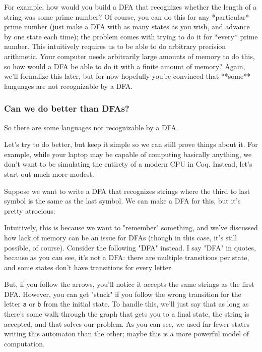 For example, how would you build a DFA that recognizes whether the length of a string was some prime number?
Of course, you can do this for any *particular* prime number (just make a DFA with as many states as you wish, and advance by one state each time); the problem comes with trying to do it for *every* prime number.
This intuitively requires us to be able to do arbitrary precision arithmetic.
Your computer needs arbitrarily large amounts of memory to do this, so how would a DFA be able to do it with a finite amount of memory?
Again, we'll formalize this later, but for now hopefully you're convinced that **some** languages are not recognizable by a DFA.

\subsubsection{Can we do better than DFAs?}

So there are some languages not recognizable by a DFA.

Let's try to do better, but keep it simple so we can still prove things about it.
For example, while your laptop may be capable of computing basically anything, we don't want to be simulating the entirety of a modern CPU in Coq.
Instead, let's start out much more modest.

Suppose we want to write a DFA that recognizes strings where the third to last symbol is the same as the last symbol.
We can make a DFA for this, but it's pretty atrocious:


Intuitively, this is because we want to "remember" something, and we've discussed how lack of memory can be an issue for DFAs (though in this case, it's still possible, of course).
Consider the following "DFA" instead.
I say "DFA" in quotes, because as you can see, it's not a DFA: there are multiple transitions per state, and some states don't have transitions for every letter.


But, if you follow the arrows, you'll notice it accepts the same strings as the first DFA.
However, you can get "stuck" if you follow the wrong transition for the letter \texttt{a} or \texttt{b} from the initial state.
To handle this, we'll just say that as long as there's some walk through the graph that gets you to a final state, the string is accepted, and that solves our problem.
As you can see, we used far fewer states writing this automaton than the other; maybe this is a more powerful model of computation.

